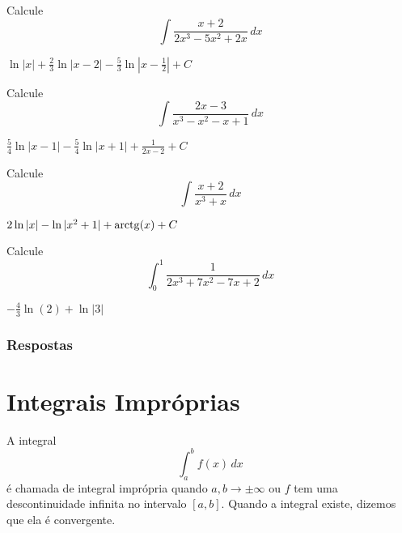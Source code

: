 \begin{exer}
  Calcule
  \begin{equation}
    \int\frac{x+2}{2x^3-5x^2+2x}\,dx
  \end{equation}
\end{exer}
\begin{resp}
  $\ln|x|+\frac{2}{3}\ln|x-2|-\frac{5}{3}\ln|x-\frac{1}{2}| + C$
\end{resp}

\begin{exer}
  Calcule
  \begin{equation}
    \int\frac{2x-3}{x^3-x^2-x+1}\,dx
  \end{equation}
\end{exer}
\begin{resp}
  $\frac{5}{4}\ln|x-1|-\frac{5}{4}\ln|x+1|+\frac{1}{2x-2} + C$
\end{resp}

\begin{exer}
  Calcule
  \begin{equation}
    \int\frac{x+2}{x^3+x}\,dx
  \end{equation}
\end{exer}
\begin{resp}
  $2\ln|x| - \ln|x^2+1| + \operatorname{arctg}(x) + C$
\end{resp}

\begin{exer}
  Calcule
  \begin{equation}
    \int_0^1\frac{1}{2x^3+7x^2-7x+2}\,dx
  \end{equation}
\end{exer}
\begin{resp}
  $-\frac{4}{3}\ln(2)+\ln|3|$
\end{resp}

\ifisbook
\subsubsection{Respostas}
\shipoutAnswer
\fi


\section{Integrais Impróprias}\label{cap_int_sec_intimp}

A integral
\begin{equation}
  \int_a^b f(x)\,dx
\end{equation}
é chamada de integral imprópria quando $a,b\to\pm\infty$ ou $f$ tem uma descontinuidade infinita no intervalo $[a, b]$. Quando a integral existe, dizemos que ela é convergente.


